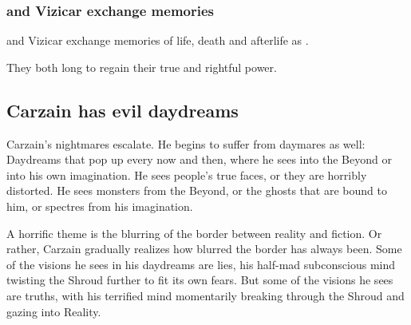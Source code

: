 \begin{garbage}
\subsubsection{\Belzir{} and Vizicar exchange memories}
\Belzir{} and Vizicar exchange memories of life, death and afterlife as \malachim. 


They both long to regain their true and rightful power.










\subsection{Carzain has evil daydreams}
Carzain's nightmares escalate. He begins to suffer from daymares as well: Daydreams that pop up every now and then, where he sees into the Beyond or into his own imagination. He sees people's true faces, or they are horribly distorted. He sees monsters from the Beyond, or the ghosts that are bound to him, or spectres from his imagination. 

A horrific theme is the blurring of the border between reality and fiction. Or rather, Carzain gradually realizes how blurred the border has always been. Some of the visions he sees in his daydreams are lies, his half-mad subconscious mind twisting the Shroud further to fit its own fears. But some of the visions he sees are truths, with his terrified mind momentarily breaking through the Shroud and gazing into Reality. 


\end{garbage}
